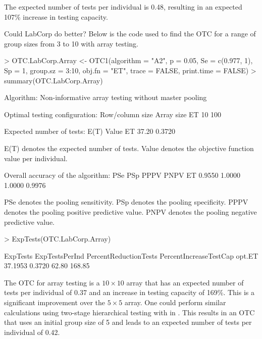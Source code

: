 \noindent The expected number of tests per individual is 0.48, resulting
in an expected 107\% increase in testing capacity.

Could LabCorp do better? Below is the code used to find the OTC for
a range of group sizes from 3 to 10 with array testing. 

\noindent 

\begin{Schunk}
\begin{Sinput}
> OTC.LabCorp.Array <- OTC1(algorithm = "A2", p = 0.05, Se = c(0.977,
     1), Sp = 1, group.sz = 3:10, obj.fn = "ET", trace = FALSE,
     print.time = FALSE)
> summary(OTC.LabCorp.Array)
\end{Sinput}
\begin{Soutput}

Algorithm: Non-informative array testing without master pooling 

Optimal testing configuration:
   Row/column size Array size
ET              10        100

Expected number of tests:
    E(T)  Value
ET 37.20 0.3720

E(T) denotes the expected number of tests.
Value denotes the objective function value per individual.

Overall accuracy of the algorithm:
      PSe    PSp   PPPV   PNPV
ET 0.9550 1.0000 1.0000 0.9976

PSe denotes the pooling sensitivity.
PSp denotes the pooling specificity.
PPPV denotes the pooling positive predictive value.
PNPV denotes the pooling negative predictive value.
\end{Soutput}
\begin{Sinput}
> ExpTests(OTC.LabCorp.Array)
\end{Sinput}
\begin{Soutput}
       ExpTests ExpTestsPerInd PercentReductionTests PercentIncreaseTestCap
opt.ET  37.1953         0.3720                 62.80                 168.85
\end{Soutput}
\end{Schunk}

The OTC for array testing is a $10\times10$ array that has an expected
number of tests per individual of 0.37 and an increase in testing
capacity of 169\%. This is a significant improvement over the $5\times5$
array. One could perform similar calculations using two-stage hierarchical
testing with  in . This results
in an OTC that uses an initial group size of 5 and leads to an expected
number of tests per individual of 0.42. 

